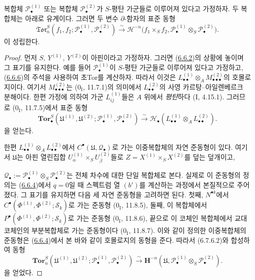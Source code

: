 \begin{proposition}[6.7.6]
\label{III.6.7.6-fr}
복합체 $\mathscr P_\bullet^{(1)}$ 또는 복합체
$\mathscr P_\bullet^{(2)}$가 $S$-평탄 가군들로 이루어져 있다고
가정하자. 두 복합체는 아래로 유계이다. 그러면 두 변수
$\partial$-함자의 표준 동형
\[
  \mathfrak{Tor}_n^S
  (f_1,f_2;\mathscr P_\bullet^{(1)},\mathscr P_\bullet^{(2)})
  \xrightarrow{\sim}
  \mathscr H^{-n}\bigl(f_1\times_S f_2,
    \mathscr P_\bullet^{(1)}\otimes_S\mathscr P_\bullet^{(2)}\bigr).
  \tag{6.7.6.1}\label{III.6.7.6.1.fr}
\]
이 성립한다.
\end{proposition}

\begin{proof}
먼저 $S$, $Y^{(1)}$, $Y^{(2)}$이 아핀이라고 가정하자. 그러면
(\hyperref[III.6.6.2-fr]{6.6.2})의 상황에 놓이며 그 표기를
유지한다. 예를 들어 $\mathscr P_\bullet^{(1)}$이 $S$-평탄 가군들로
이루어져 있다고 가정하고,
(\hyperref[III.6.6.6-fr]{6.6.6})의 주석을 사용하여 초Tor를 계산하자.
따라서 이것은
$L_{\bullet\bullet}^{(1)}\otimes_A M_{\bullet\bullet\bullet}^{(2)}$의
호몰로지이다. 여기서 $M_{\bullet\bullet\bullet}^{(2)}$는
($0_{\mathrm I}$, 11.7.1)의 의미에서
$L_{\bullet\bullet}^{(2)}$의 사영 카르탕--아일렌베르크 분해이다.
한편 가정에 의하여 가군 $L_{ij}^{(1)}$들은 $A$ 위에서
\emph{평탄}하다 (I, 4.15.1). 그러므로 ($0_{\mathrm I}$, 11.7.5)에서
표준 동형
\[
  \mathbf{Tor}_\bullet^S
  (\mathfrak U^{(1)},\mathfrak U^{(2)};
   \mathscr P_\bullet^{(1)},\mathscr P_\bullet^{(2)})
  \xrightarrow{\sim}
  \mathscr H_\bullet
  (L_{\bullet\bullet}^{(1)}\otimes_A L_{\bullet\bullet}^{(2)}).
  \tag{6.7.6.2}\label{III.6.7.6.2.fr}
\]
을 얻는다.

한편 $L_{\bullet\bullet}^{(1)}\otimes_A L_{\bullet\bullet}^{(2)}$에서
$C^\bullet(\mathfrak U,\mathscr Q_\bullet)$로 가는 이중복합체의 자연
준동형이 있다. 여기서 $\mathfrak U$는 아핀 열린집합
$U_\alpha^{(1)}\times_S U_\beta^{(2)}$들로
$Z=X^{(1)}\times_S X^{(2)}$를 덮는 덮개이고,


$\mathscr Q_\bullet
:=\mathscr P_\bullet^{(1)}\otimes_S\mathscr P_\bullet^{(2)}$는 전체
차수에 대한 단일 복합체로 본다. 실제로 이 준동형의 정의는
(\hyperref[III.6.6.4-fr]{6.6.4})에서 $q=0$일 때 스펙트럼 열
$(b')$를 계산하는 과정에서 본질적으로 주어졌다. 그 표기를 유지하면
다음 세 자연 준동형을 고려하면 된다. 첫째,
$N^{\bullet k}$에서
$C^\bullet(\Phi^{(1)},\Phi^{(2)};\mathscr S_k)$로 가는 준동형
($0_{\mathrm I}$, 11.8.5), 둘째, 이 복합체에서
$P^\bullet(\Phi^{(1)},\Phi^{(2)};\mathscr S_k)$로 가는 준동형
($0_{\mathrm I}$, 11.8.6), 끝으로 이 코체인 복합체에서 교대 코체인의
부분복합체로 가는 준동형이다 ($0_{\mathrm I}$, 11.8.7). 이와 같이
정의한 이중복합체의 준동형은
(\hyperref[III.6.6.4-fr]{6.6.4})에서 본 바와 같이 호몰로지의
동형을 준다. 따라서 (6.7.6.2)와 합성하여 동형
\[
  \mathbf{Tor}_n^S
  (\mathfrak U^{(1)},\mathfrak U^{(2)};
   \mathscr P_\bullet^{(1)},\mathscr P_\bullet^{(2)})
  \xrightarrow{\sim}
  \mathbf H^{-n}
  (\mathfrak U,\mathscr P_\bullet^{(1)}\otimes_S\mathscr P_\bullet^{(2)}).
  \tag{6.7.6.3}\label{III.6.7.6.3.fr}
\]
을 얻었다.


\end{proof}
